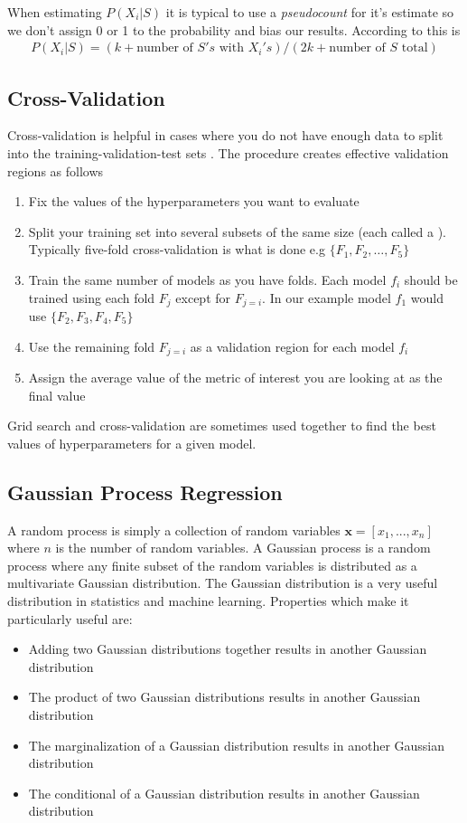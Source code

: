 When estimating $P(X_i|S)$ it is typical to use a \textit{pseudocount} for it's estimate so we don't assign 0 or 1 to the probability and bias our results. According to \cite{sutton} this is
\begin{align}
	P(X_i|S) = (k+\textrm{number~of~} S's\textrm{~with~} X_i's) / (2k+\textrm{number~of~} S \textrm{~total})
\end{align}

\subsection{Cross-Validation}
Cross-validation is helpful in cases where you do not have enough data to split into the training-validation-test sets \cite{burkov}. The procedure creates effective validation regions as follows

\begin{enumerate}
    \item Fix the values of the hyperparameters you want to evaluate
    \item Split your training set into several subsets of the same size (each called a ). Typically five-fold cross-validation is what is done e.g $\{F_1, F_2, \ldots, F_5\}$
    \item Train the same number of models as you have folds. Each model $f_i$ should be trained using each fold $F_j$ except for $F_{j=i}$. In our example model $f_1$ would use $\{F_2, F_3, F_4,F_5\}$
    \item Use the remaining fold $F_{j=i}$ as a validation region for each model $f_i$
    \item Assign the average value of the metric of interest you are looking at as the final value
\end{enumerate}
Grid search and cross-validation are sometimes used together to find the best values of hyperparameters for a given model.

\subsection{Gaussian Process Regression}

A random process is simply a collection of random variables $\textbf{x} = [x_1, ..., x_n]$ where $n$ is the number of random variables. A Gaussian process is a random process where any finite subset of the random variables is distributed as a multivariate Gaussian distribution.
The Gaussian distribution is a very useful distribution in statistics and machine learning. Properties which make it particularly useful are:
\begin{itemize}
    \item Adding two Gaussian distributions together results in another Gaussian distribution
    \item The product of two Gaussian distributions results in another Gaussian distribution
    \item The marginalization of a Gaussian distribution results in another Gaussian distribution
    \item The conditional of a Gaussian distribution results in another Gaussian distribution
\end{itemize}

